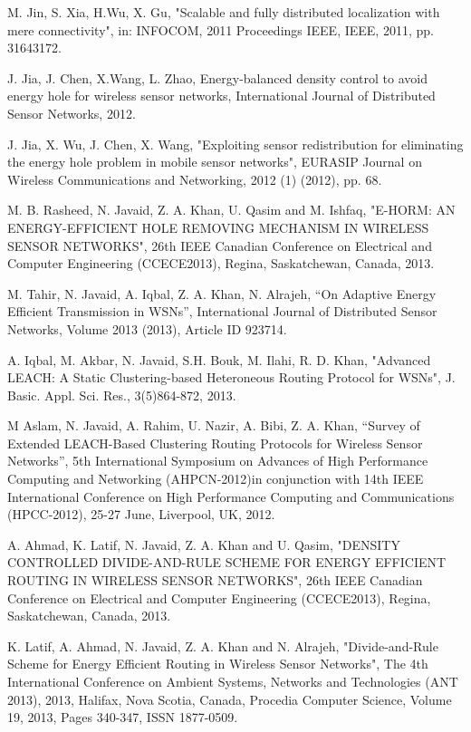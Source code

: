 \documentclass[journal]{IEEEtran}
\begin{document}
\begin{thebibliography}{9}
 M. Jin, S. Xia, H.Wu, X. Gu, "Scalable and fully distributed localization with mere connectivity", in: INFOCOM, 2011 Proceedings IEEE, IEEE, 2011, pp. 31643172.

 J. Jia, J. Chen, X.Wang, L. Zhao, Energy-balanced density control to avoid energy hole for wireless sensor networks, International Journal of Distributed Sensor Networks, 2012.

 J. Jia, X. Wu, J. Chen, X. Wang, "Exploiting sensor redistribution for eliminating the energy hole problem in mobile sensor networks", EURASIP Journal on Wireless Communications and Networking, 2012 (1) (2012), pp. 68.

 M. B. Rasheed, N. Javaid, Z. A. Khan, U. Qasim and M. Ishfaq, "E-HORM: AN ENERGY-EFFICIENT HOLE REMOVING MECHANISM IN WIRELESS SENSOR NETWORKS", 26th IEEE Canadian Conference on Electrical and Computer Engineering (CCECE2013), Regina, Saskatchewan, Canada, 2013.

 M. Tahir, N. Javaid, A. Iqbal, Z. A. Khan, N. Alrajeh, “On Adaptive Energy Efficient Transmission in WSNs”, International Journal of Distributed Sensor Networks, Volume 2013 (2013), Article ID 923714.

 A. Iqbal, M. Akbar, N. Javaid, S.H. Bouk, M. Ilahi, R. D. Khan, "Advanced LEACH: A Static Clustering-based Heteroneous Routing Protocol for WSNs", J. Basic. Appl. Sci. Res., 3(5)864-872, 2013.

 M Aslam, N. Javaid, A. Rahim, U. Nazir, A. Bibi, Z. A. Khan, “Survey of Extended LEACH-Based Clustering Routing Protocols for Wireless Sensor Networks”, 5th International Symposium on Advances of High Performance Computing and Networking (AHPCN-2012)in conjunction with 14th IEEE International Conference on High Performance Computing and Communications (HPCC-2012), 25-27 June, Liverpool, UK, 2012.

 A. Ahmad, K. Latif, N. Javaid, Z. A. Khan and U. Qasim, "DENSITY CONTROLLED DIVIDE-AND-RULE SCHEME FOR ENERGY EFFICIENT ROUTING IN WIRELESS SENSOR NETWORKS", 26th IEEE Canadian Conference on Electrical and Computer Engineering (CCECE2013), Regina, Saskatchewan, Canada, 2013.

 K. Latif, A. Ahmad, N. Javaid, Z. A. Khan and N. Alrajeh, "Divide-and-Rule Scheme for Energy Efficient Routing in Wireless Sensor Networks", The 4th International Conference on Ambient Systems, Networks and Technologies (ANT 2013), 2013, Halifax, Nova Scotia, Canada, Procedia Computer Science, Volume 19, 2013, Pages 340-347, ISSN 1877-0509.
\end{thebibliography}
\end{document}

